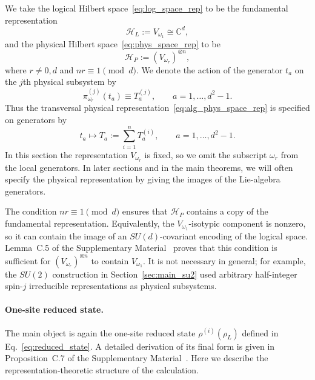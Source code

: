\documentclass[10pt,twocolumn,superscriptaddress,aps,amsmath,amssymb,citeautoscript,floatfix,prx,longbibliography]{revtex4-2}
\newcounter{alg}
\theoremstyle{plain}
\theoremstyle{plain}
\theoremstyle{plain}
\theoremstyle{plain}
\theoremstyle{plain}
\theoremstyle{plain}
\begin{document}
We take the logical Hilbert space~\eqref{eq:log_space_rep} to be the fundamental representation
$$
\mathcal H_L:=V_{\omega_1}\cong \mathbb C^d ,
$$
and the physical Hilbert space~\eqref{eq:phys_space_rep} to be
$$
\mathcal H_P:=(V_{\omega_r})^{\otimes n},
$$
where $r\neq 0,d$ and $nr\equiv 1\pmod d$. We denote the action of the generator $t_a$ on the $j$th physical subsystem by
$$
\pi_{\omega_r}^{(j)}(t_a)\equiv T_a^{(j)},
\qquad
a=1,\ldots,d^2-1 .
$$
Thus the transversal physical representation~\eqref{eq:alg_phys_space_rep} is specified on generators by
$$
t_a
\longmapsto
T_a
:=
\sum_{i=1}^n T_a^{(i)},
\qquad
a=1,\ldots,d^2-1 .
$$
In this section the representation $V_{\omega_r}$ is fixed, so we omit the subscript $\omega_r$ from the local generators. In later sections and in the main theorems, we will often specify the physical representation by giving the images of the Lie-algebra generators.

The condition $nr\equiv 1\pmod d$ ensures that $\mathcal H_P$ contains a copy of the fundamental representation. Equivalently, the $V_{\omega_1}$-isotypic component is nonzero, so it can contain the image of an $SU(d)$-covariant encoding of the logical space. Lemma~C.5 of the Supplementary Material~\cite{SuppMat} proves that this condition is sufficient for $(V_{\omega_r})^{\otimes n}$ to contain $V_{\omega_1}$. It is not necessary in general; for example, the $SU(2)$ construction in Section~\ref{sec:main_su2} used arbitrary half-integer spin-$j$ irreducible representations as physical subsystems.

\paragraph{One-site reduced state.}

The main object is again the one-site reduced state $\rho^{(i)}(\rho_L)$ defined in Eq.~\eqref{eq:reduced_state}. A detailed derivation of its final form is given in Proposition~C.7 of the Supplementary Material~\cite{SuppMat}. Here we describe the representation-theoretic structure of the calculation.
\end{document}
